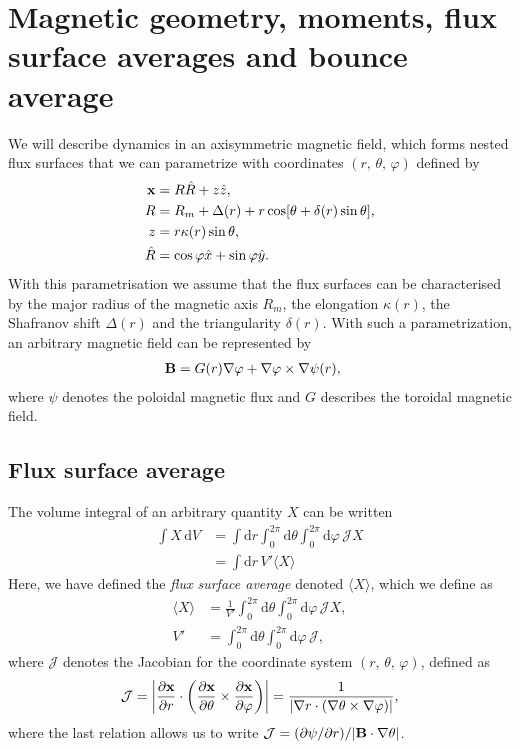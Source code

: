 \documentclass[11pt,a4paper]{article}
\newcommand{\rd}{\ensuremath{\mathrm{d}}}
\renewcommand{\b}[1]{\ensuremath{ {\bf #1 } }}
\begin{document}
\section{Magnetic geometry, moments, flux surface averages and bounce average}
We will describe dynamics in an axisymmetric magnetic field, which forms nested flux surfaces that we can parametrize with coordinates $(r,\,\theta,\,\varphi)$ defined by
\begin{align}
\b{x} &= R\hat{R} + z\hat{z}, \nonumber \\
R &= R_m + \Delta(r) + r\cos[\theta +\delta(r) \sin\theta], \nonumber \\
z &= r \kappa(r) \sin\theta, \nonumber \\
\hat{R} &= \cos\varphi \hat{x} + \sin\varphi \hat{y}.
\label{eq:geometry coordinates}
\end{align}
With this parametrisation we assume that the flux surfaces can be characterised by the major radius of the magnetic axis $R_m$, the elongation $\kappa(r)$, the Shafranov shift $\Delta(r)$ and the triangularity $\delta(r)$.
With such a parametrization, an arbitrary magnetic field can be represented by
\begin{align}
\b{B} &= G(r) \nabla \varphi + \nabla \varphi \times \nabla \psi(r),
\end{align}
where $\psi$ denotes the poloidal magnetic flux and $G$ describes the toroidal magnetic field.

\subsection{Flux surface average}
The volume integral of an arbitrary quantity $X$ can be written
\begin{align}
\int X \,\rd V &= \int\rd r  \int_0^{2\pi}\rd\theta \int_0^{2\pi}\rd \varphi \,\mathcal{J}X \nonumber \\
&= \int \rd r \, V'\langle X \rangle
\end{align}
Here, we have defined the \emph{flux surface average} denoted $\langle X \rangle$, which we define as
\begin{align}
\langle X \rangle &= \frac{1}{V'} \int_0^{2\pi}\rd \theta \int_0^{2\pi}\rd \varphi \, \mathcal{J}X, \nonumber \\
V' &= \int_0^{2\pi}\rd \theta \int_0^{2\pi}\rd \varphi  \, \mathcal{J},
\end{align}
where $\mathcal{J}$ denotes the Jacobian for the coordinate system $(r,\,\theta,\,\varphi)$, defined as
\begin{align}
\mathcal{J} =\left| \frac{\partial \b{x}}{\partial r}\cdot \left( \frac{\partial \b{x}}{\partial \theta}\times \frac{\partial\b{x}}{\partial \varphi}\right)\right| = \frac{1}{|\nabla r \cdot(\nabla \theta \times \nabla \varphi)|},
\end{align}
where the last relation allows us to write $\mathcal{J} = (\partial \psi/\partial r) /|\b{B}\cdot\nabla \theta|$.
\end{document}
